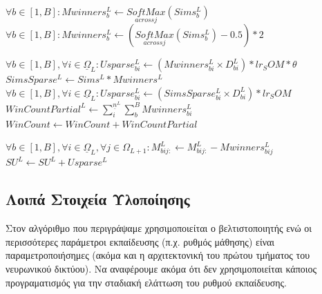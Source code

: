 {\begin{algorithm}
\begin{algorithmic}
              \State $\forall b \in [1,B]: Mwinners^L_{b} \gets \underset{across j}{SoftMax}(Sims^L_b)$
              \State $\forall b \in [1,B]: Mwinners^L_b \gets (\underset{across j}{SoftMax}(Sims^L_b) - 0.5) \ast 2$
            \EndIf
            \State {}

              \State $\forall b \in [1,B], \forall i \in \underline{\Omega}_L: Usparse^L_{bi} \gets (Mwinners^L_{bi} \times D^L_{bi}) \ast lr_SOM \ast \theta$
              \State $SimsSparse^L \gets Sims^L \ast Mwinners^L$
              \State $\forall b \in [1,B], \forall i \in \underline{\Omega}_L: Usparse_{bi}^L \gets (SimsSparse^L_{bi} \times D^L_{bi}) \ast lr_SOM$
            \EndIf
            \State {}
              \State $WinCountPartial^L \gets \sum_i^{\underline{n}^L} \sum_b^B Mwinners^L_{bi}$
              \State $WinCount \gets WinCount + WinCountPartial$ 

            \EndIf
              \State $\forall b \in [1,B], \forall i \in \underline{\Omega}_L, \forall j \in \Omega_{L+1}: M^L_{bij:} \gets M^L_{bij:} - Mwinners^L_{bij}$
              \State {}
            \EndIf
            \State {}
            \State $SU^L \gets SU^L + Usparse^L$ 

      \EndFor
    \EndProcedure
  \end{algorithmic}
\end{algorithm}
}
\subsection{Λοιπά Στοιχεία Υλοποίησης}

Στον αλγόριθμο που περιγράψαμε χρησιμοποιείται ο βελτιστοποιητής  ενώ οι περισσότερες παράμετροι εκπαίδευσης (π.χ. ρυθμός μάθησης) είναι παραμετροποιήσημες (ακόμα και η αρχιτεκτονική του πρώτου τμήματος του νευρωνικού δικτύου). Να αναφέρουμε ακόμα ότι δεν χρησιμοποιείται κάποιος προγραματισμός για την σταδιακή ελάττωση του ρυθμού εκπαίδευσης. \par

